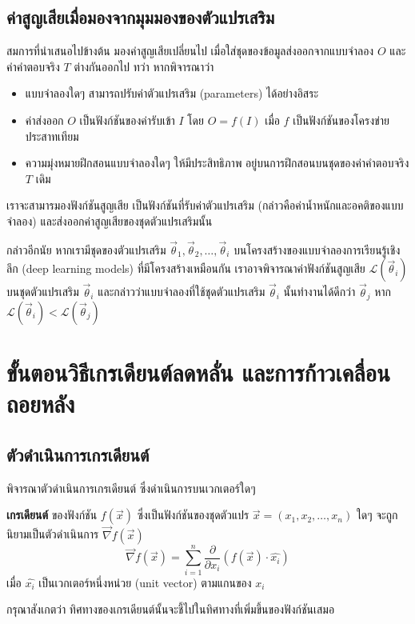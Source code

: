 \documentclass{cpereport}
\begin{document}
\subsection{ค่าสูญเสียเมื่อมองจากมุมมองของตัวแปรเสริม}
สมการที่นำเสนอไปข้างต้น มองค่าสูญเสียเปลี่ยนไป เมื่อใส่ชุดของข้อมูลส่งออกจากแบบจำลอง $O$ และค่าคำตอบจริง $T$ ต่างกันออกไป ทว่า หากพิจารณาว่า
\begin{itemize}
    \item แบบจำลองใดๆ สามารถปรับค่าตัวแปรเสริม (parameters) ได้อย่างอิสระ
    \item ค่าส่งออก $O$ เป็นฟังก์ชันของค่ารับเข้า $I$ โดย $O = f(I)$ เมื่อ $f$ เป็นฟังก์ชันของโครงข่ายประสาทเทียม
    \item ความมุ่งหมายฝึกสอนแบบจำลองใดๆ ให้มีประสิทธิภาพ อยู่บนการฝึกสอนบนชุดของค่าคำตอบจริง $T$ เดิม
\end{itemize}
เราจะสามารมองฟังก์ชันสูญเสีย เป็นฟังก์ชันที่รับค่าตัวแปรเสริม (กล่าวคือค่าน้ำหนักและอคติของแบบจำลอง) และส่งออกค่าสูญเสียของชุดตัวแปรเสริมนั้น

กล่าวอีกนัย หากเรามีชุดของตัวแปรเสริม $\vec{\theta}_1, \vec{\theta}_2, \dots, \vec{\theta}_i$ บนโครงสร้างของแบบจำลองการเรียนรู้เชิงลึก (deep learning models) ที่มีโครงสร้างเหมือนกัน เราอาจพิจารณาค่าฟังก์ชันสูญเสีย $\mathscr{L}(\vec{\theta}_i)$ บนชุดตัวแปรเสริม $\vec{\theta}_i$ และกล่าวว่าแบบจำลองที่ใช้ชุดตัวแปรเสริม $\vec{\theta}_i$ นั้นทำงานได้ดีกว่า $\vec{\theta}_j$ หาก $\mathscr{L}(\vec{\theta}_i) < \mathscr{L}(\vec{\theta}_j)$ 

\section{ขั้นตอนวิธีเกรเดียนต์ลดหลั่น และการก้าวเคลื่อนถอยหลัง}

\subsection{ตัวดำเนินการเกรเดียนต์}

พิจารณาตัวดำเนินการเกรเดียนต์ ซึ่งดำเนินการบนเวกเตอร์ใดๆ

\begin{definition}
    \textbf{เกรเดียนต์} ของฟังก์ชัน $f(\vec{x})$ ซึ่งเป็นฟังก์ชันของชุดตัวแปร $\vec{x} = \left(x_1, x_2, \dots, x_n\right)$ ใดๆ จะถูกนิยามเป็นตัวดำเนินการ $\vec{\nabla}f\left(\vec{x}\right)$
    $$
        \vec{\nabla}f\left(\vec{x}\right) = \sum_{i=1}^{n} \frac{\partial}{\partial x_i} \left( f(\vec{x}) \cdot \hat{x_i} \right) 
    $$
    เมื่อ $\hat{x_i}$ เป็นเวกเตอร์หนึ่งหน่วย (unit vector) ตามแกนของ $x_i$
\end{definition}
กรุณาสังเกตว่า ทิศทางของเกรเดียนต์นั้นจะชี้ไปในทิศทางที่เพิ่มขึ้นของฟังก์ชันเสมอ
\end{document}
